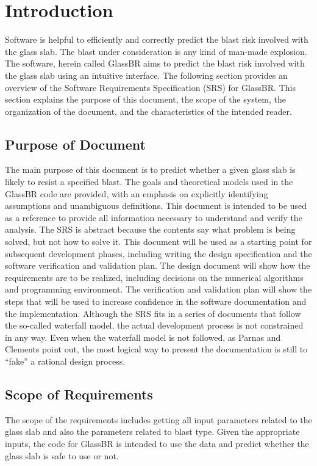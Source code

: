 \documentclass[12pt]{article}
\begin{document}
\section{Introduction}
\label{Sec:Intro}
Software is helpful to efficiently and correctly predict the blast risk involved with the glass slab. The blast under consideration is any kind of man-made explosion. The software, herein called GlassBR aims to predict the blast risk involved with the glass slab using an intuitive interface.
The following section provides an overview of the Software Requirements Specification (SRS) for GlassBR. This section explains the purpose of this document, the scope of the system, the organization of the document, and the characteristics of the intended reader.
\subsection{Purpose of Document}
\label{Sec:DocPurpose}
The main purpose of this document is to predict whether a given glass slab is likely to resist a specified blast. The goals and theoretical models used in the GlassBR code are provided, with an emphasis on explicitly identifying assumptions and unambiguous definitions. This document is intended to be used as a reference to provide all information necessary to understand and verify the analysis. The SRS is abstract because the contents say what problem is being solved, but not how to solve it.
This document will be used as a starting point for subsequent development phases, including writing the design specification and the software verification and validation plan. The design document will show how the requirements are to be realized, including decisions on the numerical algorithms and programming environment. The verification and validation plan will show the steps that will be used to increase confidence in the software documentation and the implementation. Although the SRS fits in a series of documents that follow the so-called waterfall model, the actual development process is not constrained in any way. Even when the waterfall model is not followed, as Parnas and Clements point out, the most logical way to present the documentation is still to ``fake'' a rational design process.
\subsection{Scope of Requirements}
\label{Sec:ReqsScope}
The scope of the requirements includes getting all input parameters related to the glass slab and also the parameters related to blast type. Given the appropriate inputs, the code for GlassBR is intended to use the data and predict whether the glass slab is safe to use or not.
\end{document}
